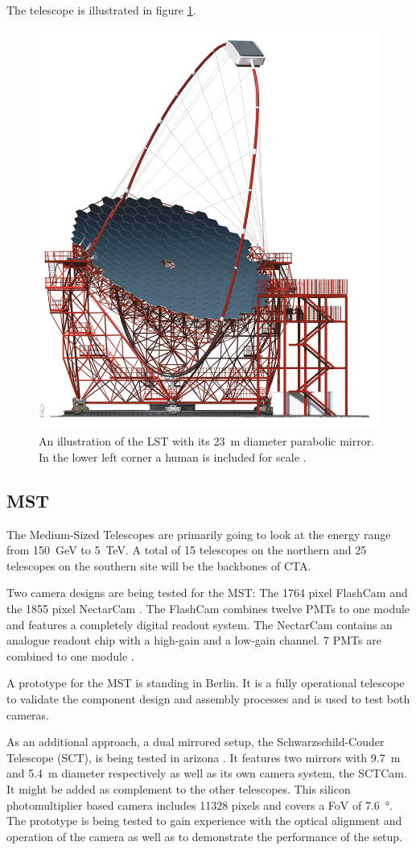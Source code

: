 The telescope is illustrated in figure \ref{fig:lst}.

\begin{figure}
		\centering
		\captionsetup{width=0.9\linewidth}
		\includegraphics[width=.5\textwidth]{images/LST.png}
		\caption{
			An illustration of the LST with its
			\SI{23}{\meter} diameter parabolic mirror.
			In the lower left corner a human is included for scale \cite{cta_web}.}
		\label{fig:lst}
\end{figure}

\subsection{MST}
The Medium-Sized Telescopes are primarily going to look at the 
energy range from \SI{150}{\giga\electronvolt} to \SI{5}{\tera\electronvolt}.
A total of 15 telescopes on the northern and 25 telescopes on the southern site
will be the backbones of CTA.

Two camera designs are being tested for the MST:
The 1764 pixel FlashCam and the 1855 pixel NectarCam \cite{cta_web}.
The FlashCam combines twelve PMTs to one module and features a completely
digital readout system.
The NectarCam contains an analogue readout chip with a high-gain and a low-gain
channel. 7 PMTs are combined to one module \cite{doi:10.1063/1.4969023}.

A prototype for the MST is standing in Berlin.
It is a fully operational telescope
to validate the component design and assembly processes and is used to test
both cameras.

As an additional approach, a dual mirrored setup, the Schwarzschild-Couder Telescope (SCT), is being tested in arizona \cite{cta_web}.
It features two mirrors with \SI{9.7}{\meter} and \SI{5.4}{\meter} diameter respectively
as well as its own camera system, the SCTCam.
It might be added as complement to the other telescopes.
This silicon photomultiplier based camera includes 11328 pixels and covers a FoV of
\SI{7.6}{\degree}.
The prototype is being tested to gain experience with the optical alignment and operation of
the camera as well as to demonstrate the performance of the setup.


